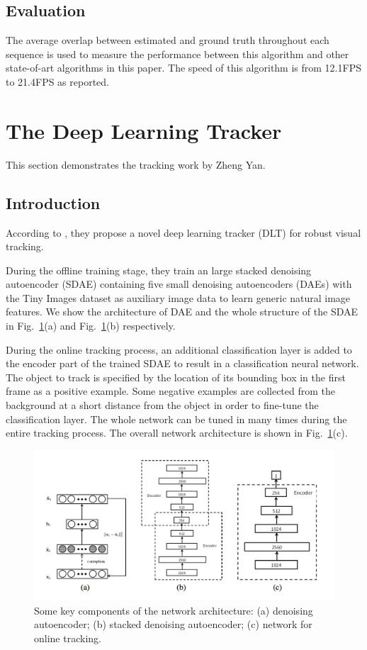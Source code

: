 \documentclass{article}
\begin{document}
\subsection{Evaluation}
The average overlap between estimated and ground truth throughout each sequence is used to measure the performance between this algorithm and other state-of-art algorithms in this paper.
The speed of this algorithm is from 12.1FPS to 21.4FPS as reported.


\section{The Deep Learning Tracker}
This section demonstrates the tracking work by Zheng Yan.

\subsection{Introduction}
According to \cite{dlt}, they propose a novel deep learning tracker (DLT) for robust visual tracking.

During the offline training stage, they train an large stacked denoising autoencoder (SDAE) containing five small denoising autoencoders (DAEs) with the Tiny Images dataset \cite{tiny} as auxiliary image data to learn generic natural image features.
We show the architecture of DAE and the whole structure of the SDAE in Fig.~\ref{fig:dlt}(a) and Fig.~\ref{fig:dlt}(b) respectively.

During the online tracking process, an additional classification layer is added to the encoder part of the trained SDAE to result in a classification neural network.
The object to track is specified by the location of its bounding box in the first frame as a positive example.
Some negative examples are collected from the background at a short distance from the object in order to fine-tune the classification layer.
The whole network can be tuned in many times during the entire tracking process.
The overall network architecture is shown in Fig.~\ref{fig:dlt}(c).

\begin{center}
    \begin{figure}[hbt]
      \includegraphics[width=\textwidth]{dlt.png}
      \caption{Some key components of the network architecture: (a) denoising autoencoder; (b) stacked denoising autoencoder; (c) network for online tracking.}
      \label{fig:dlt}
    \end{figure}
\end{center}
\end{document}
